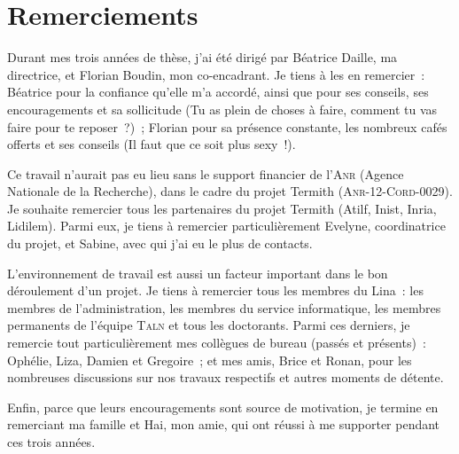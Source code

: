 \chapter*{Remerciements}
\label{chap:main-acknowledgment}
  Durant mes trois années de thèse, j'ai été dirigé par Béatrice Daille, ma
  directrice, et Florian Boudin, mon co-encadrant. Je tiens à les en remercier~:
  Béatrice pour la confiance qu'elle m'a accordé, ainsi que pour ses conseils,
  ses encouragements et sa sollicitude (\og{}Tu as plein de choses à faire,
  comment tu vas faire pour te reposer~?\fg{})~; Florian pour sa présence
  constante, les nombreux cafés offerts et ses conseils (\og{}Il faut que ce
  soit plus sexy~!\fg{}).

  Ce travail n'aurait pas eu lieu sans le support financier de l'\textsc{Anr}
  (Agence Nationale de la Recherche), dans le cadre du projet Termith
  (\textsc{Anr}-12-\textsc{Cord}-0029). Je souhaite remercier tous les
  partenaires du projet Termith (Atilf, Inist, Inria, Lidilem). Parmi eux, je
  tiens à remercier particulièrement Evelyne, coordinatrice du projet, et
  Sabine, avec qui j'ai eu le plus de contacts.

  L'environnement de travail est aussi un facteur important dans le bon
  déroulement d'un projet. Je tiens à remercier tous les membres du Lina~:
  les membres de l'administration, les membres du service informatique, les
  membres permanents de l'équipe \textsc{Taln} et tous les doctorants. Parmi ces
  derniers, je remercie tout particulièrement mes collègues de bureau (passés et
  présents)~: Ophélie, Liza, Damien et Gregoire~; et mes amis, Brice et Ronan,
  pour les nombreuses discussions sur nos travaux respectifs et autres moments
  de détente.

  Enfin, parce que leurs encouragements sont source de motivation, je termine en
  remerciant ma famille et Hai, mon amie, qui ont réussi à me supporter pendant
  ces trois années.

